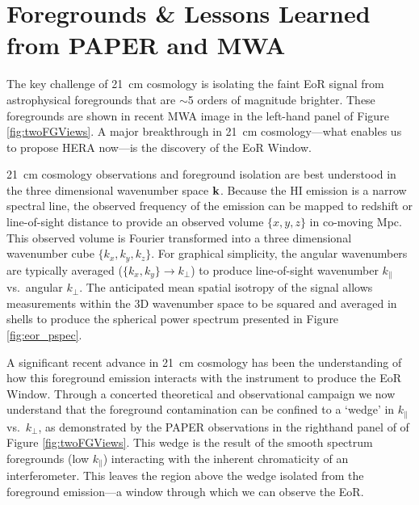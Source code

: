 \documentclass[preprint]{aastex}
\def\kperp{k_{\bot}}
\def\kpar{k_{\|}}
\def\k{{\bf k}}
\def\HI{{H{\small I }}}
\begin{document}
\vspace{-0.25in}
\section{Foregrounds \& Lessons Learned from PAPER and MWA}
\label{LessonsSec}

The key challenge of 21~cm cosmology is isolating the faint EoR signal from
astrophysical foregrounds that are $\sim$5 orders of magnitude brighter. These foregrounds
are shown in recent MWA image 
in the left-hand panel of Figure \ref{fig:twoFGViews}. A major breakthrough in
21~cm cosmology---what enables us to propose HERA now---is the discovery of the
EoR Window.

21~cm cosmology observations and foreground isolation are best understood in
the three dimensional wavenumber space $\k$.  Because the \HI emission is a
narrow spectral line, the observed frequency of the emission can be mapped to
redshift or line-of-sight distance to provide an observed volume $\{x,y,z\}$ in
co-moving Mpc. This observed volume is Fourier transformed into a three dimensional
wavenumber cube $\{k_{x}, k_{y}, k_{z}\}$. For graphical simplicity, the angular
wavenumbers are typically averaged ($\{k_{x},k_{y}\}\rightarrow\kperp$) to
produce line-of-sight wavenumber $\kpar$ vs.\ angular $\kperp$. 
The anticipated mean spatial isotropy of the signal allows measurements within the 3D wavenumber space to be
squared and averaged in shells to produce the spherical power spectrum
presented in Figure \ref{fig:eor_pspec}.

A significant recent advance in 21~cm cosmology has been the understanding of how this
foreground emission interacts with the instrument to produce the EoR Window.
Through a concerted theoretical and observational campaign
\citep{morales_et_al2012,parsons_et_al2012b,vedantham_2012,Datta_2010,hazelton_et_al2013,pober_et_al2013,parsons_et_al2013,dillon_et_al2013b_trunc}
we now understand that the foreground contamination can be confined to a `wedge' in
$\kpar$ vs.\ $\kperp$, as demonstrated by the PAPER observations in the
righthand panel of of Figure \ref{fig:twoFGViews}. This wedge is the result of
the smooth spectrum foregrounds (low $\kpar$) interacting with the inherent
chromaticity of an interferometer. This leaves the region above the wedge isolated from
the foreground emission---a window through which we can observe the EoR.
\end{document}
